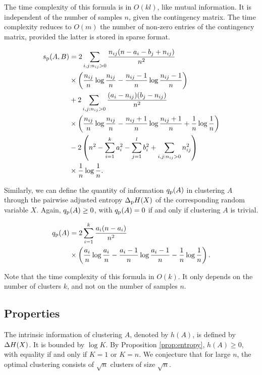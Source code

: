 The time complexity of this formula is in $O(kl)$, like mutual information. It is independent of the number of samples $n$, given the contingency matrix. The time complexity reduces to $O(m)$ the number of non-zero entries of the contingency matrix, provided the latter is stored in sparse format.

\begin{align*}\label{eq:pami-sparse}
\begin{split}
s_{\rm p}(A,B) &= 2\sum_{i, j: n_{ij} > 0} \frac{n_{ij}(n -a_i -b_j + n_{ij})}{n^2}\\
&\times  \left(\frac{n_{ij}} n \log\frac{n_{ij}}n - \frac{n_{ij} - 1} n \log\frac{n_{ij} - 1}n\right)\\
& + 2\sum_{i, j: n_{ij} > 0} \frac{(a_i - n_{ij})(b_j - n_{ij})}{n^2}\\
&\times\left(\frac{n_{ij}} n \log\frac{n_{ij}}n - \frac{n_{ij} + 1} n \log\frac{n_{ij} + 1}n  +\frac 1 n \log \frac 1 n \right)\\
& -  2 \left(n^2 - \sum_{i=1}^k  a_i^2 -  \sum_{j=1}^l  b_i^2 + \sum_{i, j: n_{ij} > 0} n_{ij}^2\right)\\
&\times \frac 1 n \log \frac 1 n .
\end{split}
\end{align*}


Similarly, we can define the quantity of information $q_{\rm p}(A)$ in clustering $A$ through the pairwise adjusted entropy $\Delta_{\rm p} H(X)$ of the corresponding random variable $X$. Again, $q_{\rm p}(A) \ge 0$, with  $q_{\rm p}(A) = 0$  if and only if clustering $A$ is trivial.

\begin{align*}%
\begin{split}
\qp(A) &= 2\sum_{i=1}^k \frac{a_i(n -a_i)}{n^2}\\
&\times \left(\frac{a_{i}} n \log\frac{a_{i}}n - \frac{a_{i} - 1} n \log\frac{a_{i} - 1}n - \frac 1 n \log \frac 1 n \right).
\end{split}
\end{align*}


Note that the time complexity of this formula in $O(k)$. It only depends on the number of clusters $k$, and not on the number of samples $n$.


\subsection{Properties}  
\label{property_sqrt_n}
The intrinsic information of clustering $A$, denoted by $h(A)$,  is defined by $\Delta H(X)$. It is bounded by $\log K$. By Proposition \ref{prop:entropy}, $h(A) \ge 0$, with equality  if and only if $K = 1$ or $K = n$. We conjecture that for large $n$, the optimal clustering consists of $\sqrt{n}$ clusters of size $\sqrt{n}$.

